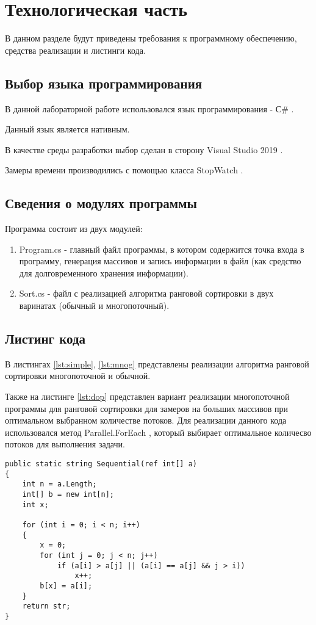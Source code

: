 \chapter{Технологическая часть}
В данном разделе будут приведены требования к программному обеспечению, средства реализации и листинги кода.

\section{Выбор языка программирования}

В данной лабораторной работе использовался язык программирования - С\# \cite{csharplang}.

Данный язык является нативным.

В качестве среды разработки выбор сделан в сторону Visual Studio 2019 \cite{wind}. 

Замеры времени производились с помощью класса StopWatch \cite{csharplang1}.

\section{Сведения о модулях программы}
Программа состоит из двух модулей:
\begin{enumerate}
	\item Program.cs - главный файл программы, в котором содержится точка входа в программу, генерация массивов и запись информации в файл (как средство для долговременного хранения информации).
	\item Sort.cs - файл с реализацией алгоритма ранговой сортировки в двух варинатах (обычный и многопоточный).
\end{enumerate}

\section{Листинг кода}
В листингах \ref{lst:simple}, \ref{lst:mnog} представлены реализации алгоритма ранговой сортировки многопоточной и обычной.

Также на листинге \ref{lst:dop} представлен вариант реализации многопоточной программы для ранговой сортировки для замеров на больших массивов при оптимальном выбранном количестве потоков. Для реализации данного кода использовался метод Parallel.ForEach \cite{mefhod}, который выбирает оптимальное количесво потоков для выполнения задачи.

\captionsetup{singlelinecheck = false, justification=raggedright}
\begin{lstlisting}[label=lst:simple,caption=Алгоритм ранговой сортировки (обычный)]
public static string Sequential(ref int[] a)
{
	int n = a.Length;
	int[] b = new int[n];
	int x;

	for (int i = 0; i < n; i++)
	{
		x = 0;
		for (int j = 0; j < n; j++)
			if (a[i] > a[j] || (a[i] == a[j] && j > i))
				x++;
		b[x] = a[i]; 
	}
	return str;
}
\end{lstlisting}


